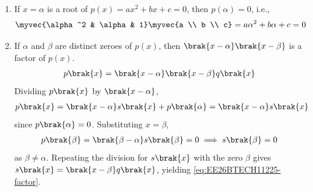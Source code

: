 \begin{enumerate}[label=\thesubsection.\arabic*, ref=\thesubsection.\theenumi]

\item If $x = \alpha$ is a root of $p(x) = ax^2 + bx + c = 0$, then $p(\alpha) = 0$, i.e.,
\begin{align}
	\myvec{\alpha^2 & \alpha & 1}\myvec{a \\ b \\ c} = a\alpha^2 + b\alpha + c = 0
	\label{eq:EE26BTECH11225-root}
\end{align}

\item If $\alpha$ and $\beta$ are distinct zeroes of $p(x)$, then $\brak{x - \alpha}\brak{x - \beta}$ is a factor of $p(x)$.
\begin{align}
	p\brak{x} = \brak{x - \alpha}\brak{x - \beta}q\brak{x}
	\label{eq:EE26BTECH11225-factor}
\end{align}
\solution
Dividing $p\brak{x}$ by $\brak{x - \alpha}$,
\begin{align}
	p\brak{x} = \brak{x - \alpha}s\brak{x} + p\brak{\alpha}
	= \brak{x - \alpha}s\brak{x}
\end{align}
since $p\brak{\alpha} = 0$. Substituting $x = \beta$,
\begin{align}
	p\brak{\beta} = \brak{\beta - \alpha}s\brak{\beta} = 0
	\implies s\brak{\beta} = 0
\end{align}
as $\beta \neq \alpha$. Repeating the division for $s\brak{x}$ with the zero $\beta$ gives
$s\brak{x} = \brak{x - \beta}q\brak{x}$, yielding \eqref{eq:EE26BTECH11225-factor}.


\end{enumerate}

